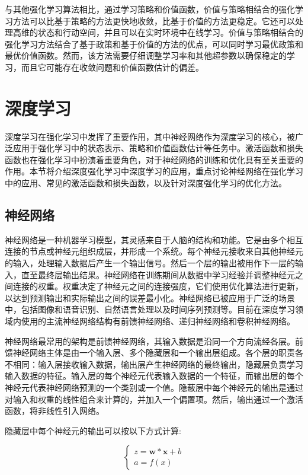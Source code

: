 与其他强化学习算法相比，通过学习策略和价值函数，价值与策略相结合的强化学习方法可以比基于策略的方法更快地收敛，比基于价值的方法更稳定。它还可以处理高维的状态和行动空间，并且可以在实时环境中在线学习。价值与策略相结合的强化学习方法结合了基于政策和基于价值的方法的优点，可以同时学习最优政策和最优价值函数。然而，该方法需要仔细调整学习率和其他超参数以确保稳定的学习，而且它可能存在收敛问题和价值函数估计的偏差。


\section{深度学习}
\label{section:2.2}

深度学习在强化学习中发挥了重要作用，其中神经网络作为深度学习的核心，被广泛应用于强化学习中的状态表示、策略和价值函数估计等任务中。激活函数和损失函数也在强化学习中扮演着重要角色，对于神经网络的训练和优化具有至关重要的作用。本节将介绍深度强化学习中深度学习的应用，重点讨论神经网络在强化学习中的应用、常见的激活函数和损失函数，以及针对深度强化学习的优化方法。

\subsection{神经网络}

神经网络是一种机器学习模型，其灵感来自于人脑的结构和功能。它是由多个相互连接的节点或神经元组织成层，并形成一个系统。每个神经元接收来自其他神经元的输入，处理输入数据后产生一个输出信号。然后一个层的输出被用作下一层的输入，直至最终层输出结果。神经网络在训练期间从数据中学习经验并调整神经元之间连接的权重。权重决定了神经元之间的连接强度，它们使用优化算法进行更新，以达到预测输出和实际输出之间的误差最小化。神经网络已被应用于广泛的场景中，包括图像和语音识别、自然语言处理以及时间序列预测等。目前在深度学习领域内使用的主流神经网络结构有前馈神经网络、递归神经网络和卷积神经网络。

神经网络最常用的架构是前馈神经网络，其输入数据是沿同一个方向流经各层。前馈神经网络主体是由一个输入层、多个隐藏层和一个输出层组成。各个层的职责各不相同：输入层接收输入数据，输出层产生神经网络的最终输出，隐藏层负责学习输入数据的特征。输入层的每个神经元代表输入数据的一个特征，而输出层的每个神经元代表神经网络预测的一个类别或一个值。隐蔽层中每个神经元的输出是通过对输入和权重的线性组合来计算的，并加入一个偏置项。然后，输出通过一个激活函数，将非线性引入网络。

隐藏层中每个神经元的输出可以按以下方式计算:

\begin{equation}
\label{eq:2_13}
\left\{\begin{array}{c}
z = \mathbf w *\mathbf x + b \\
a = f(x)
\end{array}\right.
\end{equation}

